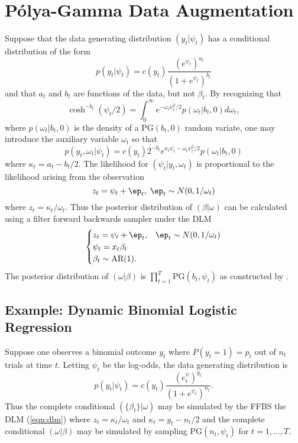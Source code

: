 \documentclass[11pt]{article}
\newcommand{\Polya}{P\'{o}lya}
\newcommand{\PG}{\text{PG}}
\begin{document}
\section{\Polya-Gamma Data Augmentation}

Suppose that the data generating distribution $(y_t | \psi_t)$ has a conditional
distribution of the form
\[
p(y_t | \psi_t) = c(y_t) \frac{(e^{\psi_t})^{a_t}}{(1+e^{\psi_t})^{b_t}}
\]
and that $a_t$ and $b_t$ are functions of the data, but not $\beta_t$.  By
recognizing that
\[
\cosh^{-b_t}(\psi_t / 2) = \int_0^\infty e^{-\omega_t \psi_t^2 / 2} p(\omega_t |
b_t, 0) d \omega_t,
\]
where $p(\omega_t | b_t, 0)$ is the density of a $\PG(b_t, 0)$ random variate,
one may introduce the auxiliary variable $\omega_t$ so that
\[
p(y_t, \omega_t | \psi_t) = c(y_t) 2^{-b_t} e^{\kappa_t \psi_t -\omega_t
  \psi_t^2/2} p(\omega_t | b_t, 0)
\]
where $\kappa_t = a_t - b_t / 2$.  The likelihood for $(\psi_t | y_t, \omega_t)$
is proportional to the likelihood arising from the observation
\[
z_t = \psi_t + \ep_t, \; \ep_t \sim N(0, 1/\omega_t)
\]
where $z_t = \kappa_t / \omega_t$.  Thus the posterior distribution of $(\beta |
\omega)$ can be calculated using a filter forward backwards sampler under the
DLM
\begin{equation}
\label{eqn:dlm}
\begin{cases}
z_t = \psi_t + \ep_t, & \ep_t \sim N(0, 1/\omega_t) \\
\psi_t = x_t \beta_t \\
\beta_t \sim \text{AR}(1).
\end{cases}
\end{equation}
The posterior distribution of $(\omega | \beta)$ is $\prod_{t=1}^T \PG(b_t,
\psi_t)$ as constructed by \cite{polson-etal-2012}.

\subsection{Example: Dynamic Binomial Logistic Regression}

Suppose one observes a binomial outcome $y_t$ where $P(y_t = 1) = p_t$ out of
$n_t$ trials at time $t$.  Letting $\psi_t$ be the log-odds, the data generating
distribution is
\[
p(y_t | \psi_t) = c(y_t) \frac{(e^\psi_t)^{y_t}}{(1+e^{\psi_t})^{n_t}}.
\]
Thus the complete conditional $(\{\beta_t\} | \omega)$ may be simulated by the
FFBS the DLM (\ref{eqn:dlm}) where $z_t = \kappa_t / \omega_t$ and $\kappa_t =
y_t - n_t / 2$ and the complete conditional $(\omega | \beta)$ may be simulated
by sampling $\PG(n_t, \psi_t)$ for $t=1, \ldots, T$.
\end{document}

